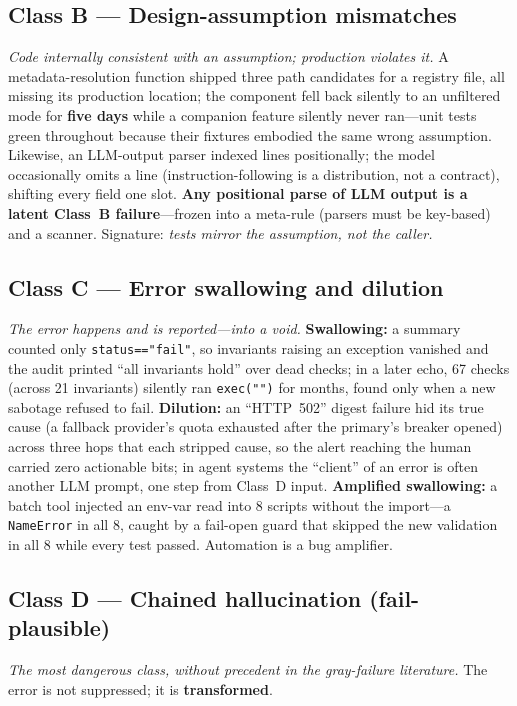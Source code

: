\documentclass[conference]{IEEEtran}
\begin{document}
\subsection{Class B --- Design-assumption mismatches}
\emph{Code internally consistent with an assumption; production violates
it.} A metadata-resolution function shipped three path candidates for a
registry file, all missing its production location; the component fell
back silently to an unfiltered mode for \textbf{five days} while a
companion feature silently never ran---unit tests green throughout because
their fixtures embodied the same wrong assumption. Likewise, an LLM-output
parser indexed lines positionally; the model occasionally omits a line
(instruction-following is a distribution, not a contract), shifting every
field one slot. \textbf{Any positional parse of LLM output is a latent
Class~B failure}---frozen into a meta-rule (parsers must be key-based) and
a scanner. Signature: \emph{tests mirror the assumption, not the caller.}

\subsection{Class C --- Error swallowing and dilution}
\emph{The error happens and is reported---into a void.} \textbf{Swallowing:}
a summary counted only \texttt{status=="fail"}, so invariants raising an
exception vanished and the audit printed ``all invariants hold'' over dead
checks; in a later echo, 67 checks (across 21 invariants) silently ran
\texttt{exec("")} for months, found only when a new sabotage refused to
fail. \textbf{Dilution:} an ``HTTP~502'' digest failure hid its true
cause (a fallback provider's quota exhausted after the primary's breaker
opened) across three hops that each stripped cause, so the alert reaching
the human carried zero actionable bits; in agent systems the ``client'' of
an error is often another LLM prompt, one step from Class~D input.
\textbf{Amplified swallowing:} a batch tool injected an env-var read into 8
scripts without the import---a \texttt{NameError} in all 8, caught by a
fail-open guard that skipped the new validation in all 8 while every test
passed. Automation is a bug amplifier.

\subsection{Class D --- Chained hallucination (fail-plausible)}\label{sec:classd}
\emph{The most dangerous class, without precedent in the gray-failure
literature.} The error is not suppressed; it is \textbf{transformed}.
\end{document}
